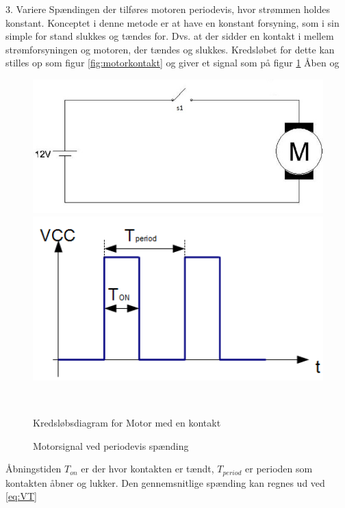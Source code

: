 

3. Variere Spændingen der tilføres motoren periodevis, hvor strømmen holdes konstant.
Konceptet i denne metode er at have en konstant forsyning, som i sin simple for stand slukkes og tændes for. Dvs. at der sidder en kontakt i mellem strømforsyningen og motoren, der tændes og slukkes. Kredsløbet for dette kan stilles op som figur \ref{fig:motorkontakt} og giver et signal som på figur \ref{fig:onoffwave}
Åben og

 \begin{figure}[htbp] \centering
\begin{minipage}[b]{0.48\textwidth} \centering
\includegraphics[width=1.00\textwidth]{billeder/Hardware/motorkontakt.jpg} %
\end{minipage} \hfill
\begin{minipage}[b]{0.48\textwidth} \centering
\includegraphics[width=1.00\textwidth]{billeder/Hardware/onoffwave.jpg} %
\end{minipage} \\ %
\begin{minipage}[t]{0.48\textwidth}
\caption{Kredsløbsdiagram for Motor med en kontakt} %
\label{fig:motorkontakt}
\end{minipage} \hfill
\begin{minipage}[t]{0.48\textwidth}
\caption{Motorsignal ved periodevis spænding } %
\label{fig:onoffwave}
\end{minipage}
\end{figure}
Åbningstiden $T_{on}$ er der hvor kontakten er tændt, $T_{period}$ er perioden som kontakten åbner og lukker. Den gennemsnitlige spænding kan regnes ud ved \ref{eq:VT}

